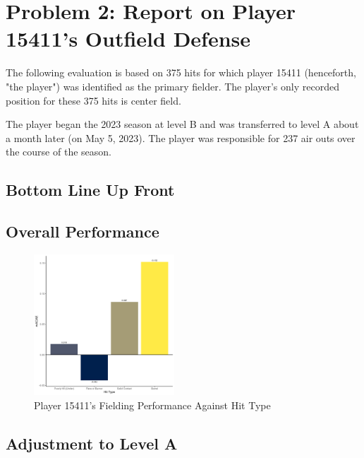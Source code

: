 
\section*{Problem 2: Report on Player 15411's Outfield Defense}
\label{sec:expts}

The following evaluation is based on 375 hits for which player 15411 (henceforth, "the player") was identified as the primary fielder. The player's only recorded position for these 375 hits is center field.

The player began the 2023 season at level B and was transferred to level A about a month later (on May 5, 2023). The player was responsible for 237 air outs over the course of the season.

\subsection{Bottom Line Up Front}

\subsection{Overall Performance}
\label{sec:overallperformance}



\begin{figure}[htb]
    \includegraphics[width = 0.47\textwidth]{../../output/figs/hit_type_15411.png}
    \caption{Player 15411's Fielding Performance Against Hit Type}
    \label{fig:hittype}
  \end{figure}

\subsection{Adjustment to Level A}
\label{sec:adjustment}

